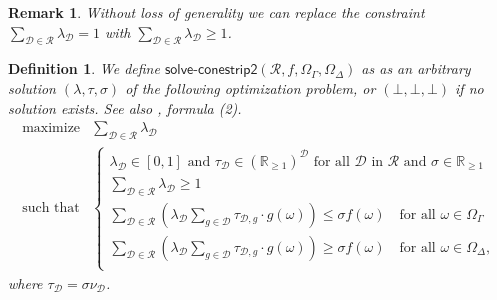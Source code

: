 \documentclass{article}
\theoremstyle{mytheorem}
\newtheorem{definition}[theorem]{Definition}
\newtheorem{remark}[theorem]{Remark}
\newcommand{\func}[1]{\ensuremath{\textsf{#1}}} %
\begin{document}
\begin{remark}
Without loss of generality we can replace the constraint
$\sum\limits_{\mathcal{D} \in \mathcal{R}} \lambda_\mathcal{D} = 1$ with
$\sum\limits_{\mathcal{D} \in \mathcal{R}} \lambda_\mathcal{D} \geq 1$.
\end{remark}

\begin{definition}
We define $\func{solve-conestrip2}(\mathcal{R}, f, \Omega_\Gamma, \Omega_\Delta)$ as as an arbitrary solution $(\lambda, \tau, \sigma)$ of the following optimization problem, or $(\bot,\bot,\bot)$ if no solution exists. See also \cite{Quaeghebeur2014}, formula (2).
\begin{equation} \label{eq:conestrip2}
\begin{array}{ll}
    \text{maximize} & \sum\limits_{\mathcal{D} \in \mathcal{R}} \lambda_\mathcal{D}
    \\ [0.5cm]
    \text{such that} & 
    \left\{
    \begin{array}{ll}
         \lambda_\mathcal{D} \in [0,1] \text{ and } \tau_\mathcal{D} \in (\mathbb{R}_{\geq 1})^\mathcal{D} \text{ for all } \mathcal{D} \text{ in } \mathcal{R} \text{ and } \sigma \in \mathbb{R}_{\geq 1} \\ [0.2cm]

         \sum\limits_{\mathcal{D} \in \mathcal{R}} \lambda_\mathcal{D} \geq 1 \\ [0.5cm]
         
         \sum\limits_{\mathcal{D} \in \mathcal{R}}
         (
         \lambda_\mathcal{D} \sum\limits_{g \in \mathcal{D}} \tau_{\mathcal{D},g} \cdot g(\omega)
         )
          \leq \sigma f(\omega)
         \quad \text{for all } \omega \in \Omega_\Gamma \\ [0.5cm]         
         
         \sum\limits_{\mathcal{D} \in \mathcal{R}}
         (
         \lambda_\mathcal{D} \sum\limits_{g \in \mathcal{D}} \tau_{\mathcal{D},g} \cdot g(\omega)
         )
          \geq \sigma f(\omega)
         \quad \text{for all } \omega \in \Omega_\Delta, \\         
    \end{array}
    \right.
\end{array}
\end{equation}
where $\tau_\mathcal{D} = \sigma \nu_\mathcal{D}$.
\end{definition}
\end{document}
